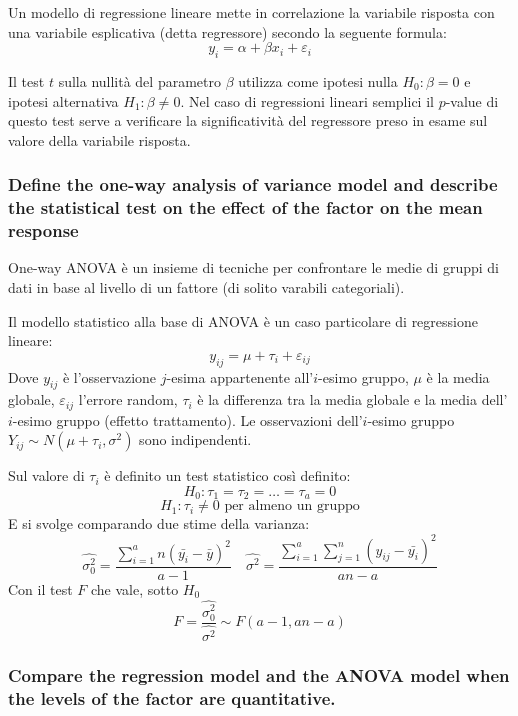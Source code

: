 \documentclass[
]{article}
\begin{document}
Un modello di regressione lineare mette in correlazione la variabile
risposta con una variabile esplicativa (detta regressore) secondo la
seguente formula: \[ y_i = \alpha + \beta x_i + \varepsilon_i \]

Il test \(t\) sulla nullità del parametro \(\beta\) utilizza come
ipotesi nulla \(H_0:\beta=0\) e ipotesi alternativa \(H_1:\beta\neq 0\).
Nel caso di regressioni lineari semplici il \(p\)-value di questo test
serve a verificare la significatività del regressore preso in esame sul
valore della variabile risposta.

\hypertarget{define-the-one-way-analysis-of-variance-model-and-describe-the-statistical-test-on-the-effect-of-the-factor-on-the-mean-response}{%
\subsubsection{Define the one-way analysis of variance model and
describe the statistical test on the effect of the factor on the mean
response}\label{define-the-one-way-analysis-of-variance-model-and-describe-the-statistical-test-on-the-effect-of-the-factor-on-the-mean-response}}

One-way ANOVA è un insieme di tecniche per confrontare le medie di
gruppi di dati in base al livello di un fattore (di solito varabili
categoriali).

Il modello statistico alla base di ANOVA è un caso particolare di
regressione lineare: \[ y_{ij} = \mu + \tau_i + \varepsilon_{ij} \] Dove
\(y_{ij}\) è l'osservazione \(j\)-esima appartenente all'\(i\)-esimo
gruppo, \(\mu\) è la media globale, \(\varepsilon_{ij}\) l'errore
random, \(\tau_i\) è la differenza tra la media globale e la media
dell'\(i\)-esimo gruppo (effetto trattamento). Le osservazioni
dell'\(i\)-esimo gruppo \(Y_{ij} \sim N(\mu+\tau_i, \sigma^2)\) sono
indipendenti.

Sul valore di \(\tau_i\) è definito un test statistico così definito:
\[ H_0:\tau_1=\tau_2=\dots=\tau_a=0 \]
\[ H_1:\tau_i \neq 0 \text{ per almeno un gruppo}\] E si svolge
comparando due stime della varianza:
\[ \hat{\sigma^2_0} = \frac{\sum_{i=1}^a n(\bar{y_i} - \bar{y})^2}{a-1} \quad \hat{\sigma^2} = \frac{\sum_{i=1}^a \sum_{j=1}^n (y_{ij} - \bar{y_i})^2}{an-a} \]
Con il test \(F\) che vale, sotto \(H_0\)
\[ F = \frac{\hat{\sigma^2_0}}{\hat{\sigma^2}} \sim F(a-1, an-a) \]

\hypertarget{compare-the-regression-model-and-the-anova-model-when-the-levels-of-the-factor-are-quantitative.}{%
\subsubsection{Compare the regression model and the ANOVA model when the
levels of the factor are
quantitative.}\label{compare-the-regression-model-and-the-anova-model-when-the-levels-of-the-factor-are-quantitative.}}
\end{document}
